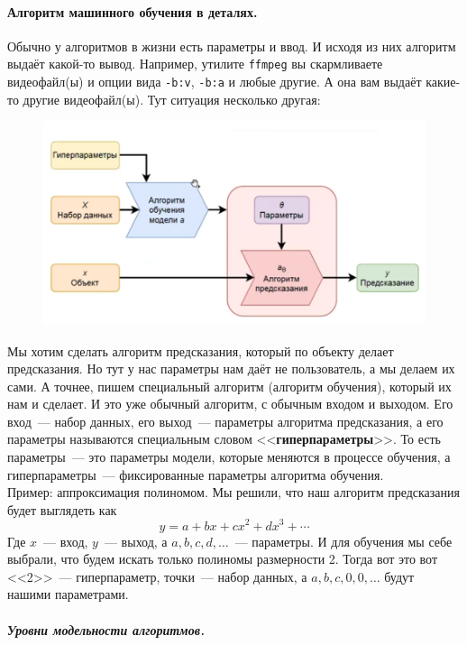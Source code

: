 \documentclass{article}
\begin{document}
    \paragraph{Алгоритм машинного обучения в деталях.}
    Обычно у алгоритмов в жизни есть параметры и ввод. И исходя из них алгоритм выдаёт какой-то вывод. Например, утилите \Verb|ffmpeg| вы скармливаете видеофайл(ы) и опции вида \Verb|-b:v|, \Verb|-b:a| и любые другие. А она вам выдаёт какие-то другие видеофайл(ы). Тут ситуация несколько другая:
    \begin{figure}[H]
        \includegraphics[scale=0.25]{Images/ml_scheme.png}
    \end{figure}\noindent
    Мы хотим сделать алгоритм предсказания, который по объекту делает предсказания. Но тут у нас параметры нам даёт не пользователь, а мы делаем их сами. А точнее, пишем специальный алгоритм (алгоритм обучения), который их нам и сделает. И это уже обычный алгоритм, с обычным входом и выходом. Его вход~--- набор данных, его выход~--- параметры алгоритма предсказания, а его параметры называются специальным словом <<\textbf{гиперпараметры}>>. То есть параметры~--- это параметры модели, которые меняются в процессе обучения, а гиперпараметры~--- фиксированные параметры алгоритма обучения.\\
    Пример: аппроксимация полиномом. Мы решили, что наш алгоритм предсказания будет выглядеть как
    \[
    y=a+bx+cx^2+dx^3+\cdots
    \]
    Где $x$~--- вход, $y$~--- выход, а $a,b,c,d,\ldots$~--- параметры. И для обучения мы себе выбрали, что будем искать только полиномы размерности 2. Тогда вот это вот <<2>>~--- гиперпараметр, точки~--- набор данных, а $a,b,c,0,0,\ldots$ будут нашими параметрами.
    \subparagraph{Уровни модельности алгоритмов.}
\end{document}
